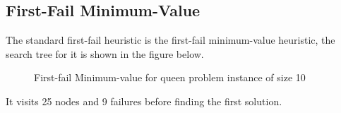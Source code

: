 \documentclass[a4paper, 11pt]{article}
\begin{document}
\subsection*{First-Fail Minimum-Value}
The standard first-fail heuristic is the first-fail minimum-value heuristic, the search tree for it is shown in the figure below. 
\begin{figure}[H]
  \begin{center}
    \caption{First-fail Minimum-value for queen problem instance of size 10}
    \label{fig:ffvm10}
  \end{center}
\end{figure}
It visits 25 nodes and 9 failures before finding the first solution.
\end{document}
